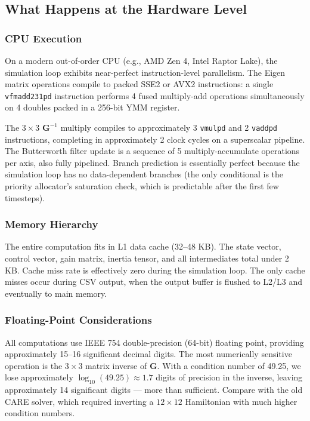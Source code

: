 \documentclass[12pt, a4paper]{article}
\begin{document}
\subsection{What Happens at the Hardware Level}

\subsubsection{CPU Execution}

On a modern out-of-order CPU (e.g., AMD Zen 4, Intel Raptor Lake), the simulation loop exhibits near-perfect instruction-level parallelism.  The Eigen matrix operations compile to packed SSE2 or AVX2 instructions: a single \texttt{vfmadd231pd} instruction performs 4 fused multiply-add operations simultaneously on 4 doubles packed in a 256-bit YMM register.

The $3\times3$ $\bm{G}^{-1}$ multiply compiles to approximately 3 \texttt{vmulpd} and 2 \texttt{vaddpd} instructions, completing in approximately 2 clock cycles on a superscalar pipeline.  The Butterworth filter update is a sequence of 5 multiply-accumulate operations per axis, also fully pipelined.  Branch prediction is essentially perfect because the simulation loop has no data-dependent branches (the only conditional is the priority allocator's saturation check, which is predictable after the first few timesteps).

\subsubsection{Memory Hierarchy}

The entire computation fits in L1 data cache (32--48 KB).  The state vector, control vector, gain matrix, inertia tensor, and all intermediates total under 2 KB.  Cache miss rate is effectively zero during the simulation loop.  The only cache misses occur during CSV output, when the output buffer is flushed to L2/L3 and eventually to main memory.

\subsubsection{Floating-Point Considerations}

All computations use IEEE 754 double-precision (64-bit) floating point, providing approximately 15--16 significant decimal digits.  The most numerically sensitive operation is the $3 \times 3$ matrix inverse of $\bm{G}$.  With a condition number of 49.25, we lose approximately $\log_{10}(49.25) \approx 1.7$ digits of precision in the inverse, leaving approximately 14 significant digits --- more than sufficient.  Compare with the old CARE solver, which required inverting a $12 \times 12$ Hamiltonian with much higher condition numbers.
\end{document}
